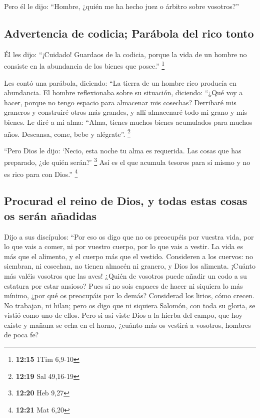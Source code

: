  Pero él le dijo: ``Hombre, ¿quién me ha hecho juez o
árbitro sobre vosotros?''

\hypertarget{advertencia-de-codicia-paruxe1bola-del-rico-tonto}{%
\subsection{Advertencia de codicia; Parábola del rico
tonto}\label{advertencia-de-codicia-paruxe1bola-del-rico-tonto}}

 Él les dijo: ``¡Cuidado! Guardaos de la codicia, porque
la vida de un hombre no consiste en la abundancia de los bienes que
posee.'' \footnote{\textbf{12:15} 1Tim 6,9-10}

 Les contó una parábola, diciendo: ``La tierra de un
hombre rico producía en abundancia.  El hombre
reflexionaba sobre su situación, diciendo: ``¿Qué voy a hacer, porque no
tengo espacio para almacenar mis cosechas?  Derribaré mis
graneros y construiré otros más grandes, y allí almacenaré todo mi grano
y mis bienes.  Le diré a mi alma: ``Alma, tienes muchos
bienes acumulados para muchos años. Descansa, come, bebe y alégrate''.
\footnote{\textbf{12:19} Sal 49,16-19}

 ``Pero Dios le dijo: `Necio, esta noche tu alma es
requerida. Las cosas que has preparado, ¿de quién serán?' \footnote{\textbf{12:20}
  Heb 9,27}  Así es el que acumula tesoros para sí mismo
y no es rico para con Dios.'' \footnote{\textbf{12:21} Mat 6,20}

\hypertarget{procurad-el-reino-de-dios-y-todas-estas-cosas-os-seruxe1n-auxf1adidas}{%
\subsection{Procurad el reino de Dios, y todas estas cosas os serán
añadidas}\label{procurad-el-reino-de-dios-y-todas-estas-cosas-os-seruxe1n-auxf1adidas}}

 Dijo a sus discípulos: ``Por eso os digo que no os
preocupéis por vuestra vida, por lo que vais a comer, ni por vuestro
cuerpo, por lo que vais a vestir.  La vida es más que el
alimento, y el cuerpo más que el vestido.  Consideren a
los cuervos: no siembran, ni cosechan, no tienen almacén ni granero, y
Dios los alimenta. ¡Cuánto más valéis vosotros que las aves!
 ¿Quién de vosotros puede añadir un codo a su estatura
por estar ansioso?  Pues si no sois capaces de hacer ni
siquiera lo más mínimo, ¿por qué os preocupáis por lo demás?
 Considerad los lirios, cómo crecen. No trabajan, ni
hilan; pero os digo que ni siquiera Salomón, con toda su gloria, se
vistió como uno de ellos.  Pero si así viste Dios a la
hierba del campo, que hoy existe y mañana se echa en el horno, ¿cuánto
más os vestirá a vosotros, hombres de poca fe?

